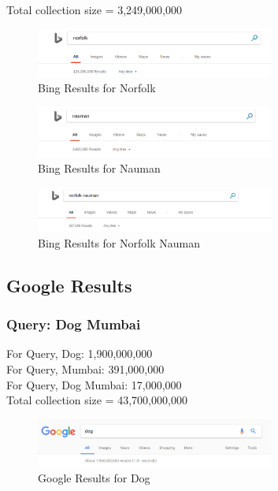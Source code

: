 \documentclass[12pt]{report}
\begin{document}
Total collection size = 3,249,000,000\\

\begin{figure}[ht] 
  \centering
  \includegraphics[width=0.7\textwidth]{Bing_norfolk.png}
  \caption{Bing Results for Norfolk}
  \label{fig:4}
\end{figure}

\begin{figure}[ht] 
  \centering
  \includegraphics[width=0.7\textwidth]{Bing_nauman.png}
  \caption{Bing Results for Nauman}
  \label{fig:5}
\end{figure}

\begin{figure}[ht] 
  \centering
  \includegraphics[width=0.7\textwidth]{Bing_norfolknauman.png}
  \caption{Bing Results for Norfolk Nauman}
  \label{fig:6}
\end{figure}

\subsection{Google Results}
\subsubsection{Query: Dog Mumbai}
For Query, Dog: 1,900,000,000\\
For Query, Mumbai: 391,000,000\\
For Query, Dog Mumbai: 17,000,000\\

Total collection size = 43,700,000,000

\begin{figure}[ht] 
  \centering
  \includegraphics[width=0.7\textwidth]{Google_Dog.png}
  \caption{Google Results for Dog}
  \label{fig:7}
\end{figure}
\end{document}
